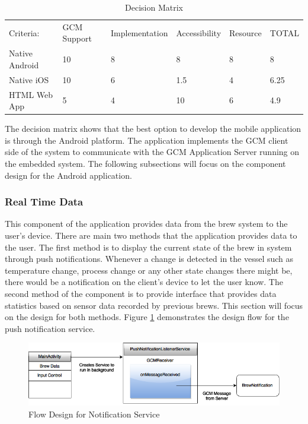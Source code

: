 \documentclass{article}
\begin{document}
\begin{table}[H]
\centering
\caption{Decision Matrix}
\label{fig:decision-matrix}
\begin{tabular}{llllll}
Criteria:      & GCM Support & Implementation & Accessibility & Resource & TOTAL \\
Native Android & 10          & 8              & 8             & 8        & 8     \\
Native iOS     & 10          & 6              & 1.5           & 4        & 6.25  \\
HTML Web App   & 5           & 4              & 10            & 6        & 4.9  
\end{tabular}
\end{table}

The decision matrix shows that the best option to develop the mobile application is through the Android platform. The application implements the GCM client side of the system to communicate with the GCM Application Server running on the embedded system. The following subsections will focus on the component design for the Android application.


\subsubsection{Real Time Data}
This component of the application provides data from the brew system to the user's device. There are main two methods that the application provides data to the user. The first method is to display the current state of the brew in system through push notifications. Whenever a change is detected in the vessel such as temperature change, process change or any other state changes there might be, there would be a notification on the client's device to let the user know. The second method of the component is to provide interface that provides data statistics based on sensor data recorded by previous brews. This section will focus on the design for both methods. Figure \ref{fig:gcm-push-notification} demonstrates the design flow for the push notification service.

\begin{figure}[H]
\begin{center}
\includegraphics[scale=0.50]{gcm-push-notification.png}
\caption{Flow Design for Notification Service}
\label{fig:gcm-push-notification}
\end{center}
\end{figure}
\end{document}
